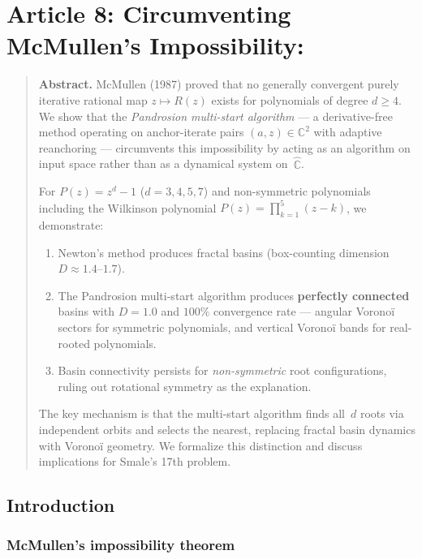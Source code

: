 \documentclass[10pt,a4paper,oneside]{book}
\theoremstyle{definition}
\theoremstyle{remark}
\newenvironment{abstract}{\begin{quote}\small\textbf{Abstract.}}{\end{quote}}
\begin{document}
\chapter{Article 8: Circumventing McMullen's Impossibility:}
\graphicspath{{../mcmullen/}{../../figures/}{../smale/figures/}}

\begin{abstract}
McMullen (1987) proved that no generally convergent purely iterative rational map $z \mapsto R(z)$ exists for polynomials of degree $d \geq 4$.  
We show that the \emph{Pandrosion multi-start algorithm} --- a derivative-free method operating on anchor-iterate pairs $(a, z) \in \mathbb{C}^2$ with adaptive reanchoring --- circumvents this impossibility by acting as an algorithm on input space rather than as a dynamical system on~$\hat{\mathbb{C}}$.

For $P(z) = z^d - 1$ ($d = 3, 4, 5, 7$) and non-symmetric polynomials including the Wilkinson polynomial $P(z) = \prod_{k=1}^5 (z-k)$, we demonstrate:
\begin{enumerate}[nosep]
\item Newton's method produces fractal basins (box-counting dimension $D \approx 1.4$--$1.7$).
\item The Pandrosion multi-start algorithm produces \textbf{perfectly connected} basins with $D = 1.0$ and $100\%$ convergence rate --- angular Vorono\"i sectors for symmetric polynomials, and vertical Vorono\"i bands for real-rooted polynomials.
\item Basin connectivity persists for \emph{non-symmetric} root configurations, ruling out rotational symmetry as the explanation.
\end{enumerate}
The key mechanism is that the multi-start algorithm finds all~$d$ roots via independent orbits and selects the nearest, replacing fractal basin dynamics with Vorono\"i geometry.  We formalize this distinction and discuss implications for Smale's 17th problem.
\end{abstract}

\section{Introduction}

\subsection{McMullen's impossibility theorem}
\end{document}
